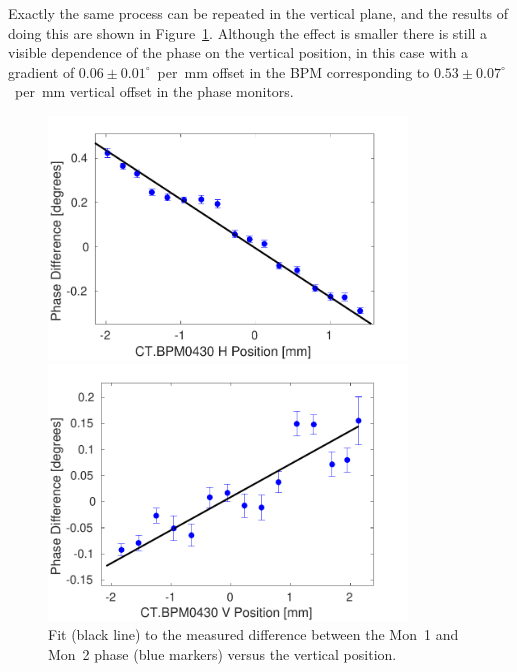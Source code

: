 Exactly the same process can be repeated in the vertical plane, and the results of doing this are shown in Figure~\ref{f:verticalScanFit}. Although the effect is smaller there is still a visible dependence of the phase on the vertical position, in this case with a gradient of \(0.06\pm0.01^\circ\)~per~mm offset in the BPM corresponding to \(0.53\pm0.07^\circ\)~per~mm vertical offset in the phase monitors.

\begin{figure}
  \centering
  \includegraphics[width=0.85\textwidth]{Figures/phaseMons/horizontalScanFit}
  \caption{Fit (black line) to the measured difference between the Mon~1 and Mon~2 phase (blue markers) versus the horizontal position.}
  \label{f:horizontalScanFit}
  \includegraphics[width=0.85\textwidth]{Figures/phaseMons/verticalScanFit}
  \caption{Fit (black line) to the measured difference between the Mon~1 and Mon~2 phase (blue markers) versus the vertical position.}
  \label{f:verticalScanFit}
\end{figure}

